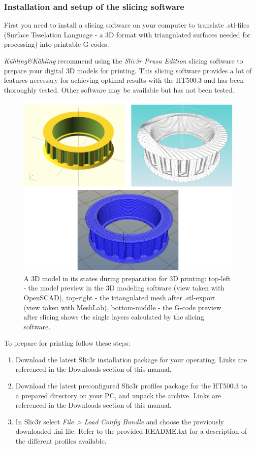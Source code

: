 \subsubsection{Installation and setup of the slicing software}

First you need to install a slicing software on your computer to 
translate .stl-files (Surface Teselation Language - a 3D format with triangulated surfaces needed for processing) into printable G-codes.

\emph{Kühling\&Kühling} recommend using the \emph{Slic3r Prusa Edition} slicing software to prepare your digital 3D models for printing. This slicing software provides a lot of features necessary for achieving optimal results with the HT500.3 and has been thoroughly tested. Other software may be available but has not been tested.

\begin{figure}[H]
  \centering
  \includegraphics[width=.7\linewidth]{./img/opm_pulleyscadandsliced.png}
  \caption{A 3D model in its states during preparation for 3D printing: top-left - the 
           model preview in the 3D modeling software (view taken with OpenSCAD), top-right - the triangulated mesh after .stl-export (view taken with MeshLab), bottom-middle - the G-code preview after slicing shows the single layers calculated by the slicing software.}

\end{figure}

 To prepare for printing follow these steps:

\begin{enumerate}
  \item Download the latest Slic3r installation package for your operating. Links are referenced in the 
        Downloads section of this manual.
  \item Download the latest preconfigured Slic3r profiles package for the HT500.3 to a prepared directory on
        your PC, and unpack the archive. Links are referenced in the 
        Downloads section of this manual.
  \item In Slic3r select \emph{File > Load Config Bundle} and choose the previously downloaded 
        .ini file. Refer to the provided README.txt for a description of the different profiles available.
\end{enumerate}


